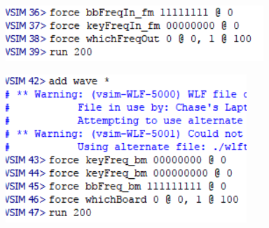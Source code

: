 \documentclass[a4paper]{article}
\begin{document}
\begin{enumerate}
\includegraphics[width=6 in]{./Images/freqMuxSimulationDo.PNG}

\includegraphics[width=6 in]{./Images/boardMuxSimulationDo.PNG}





\end{enumerate}





\end{document}
